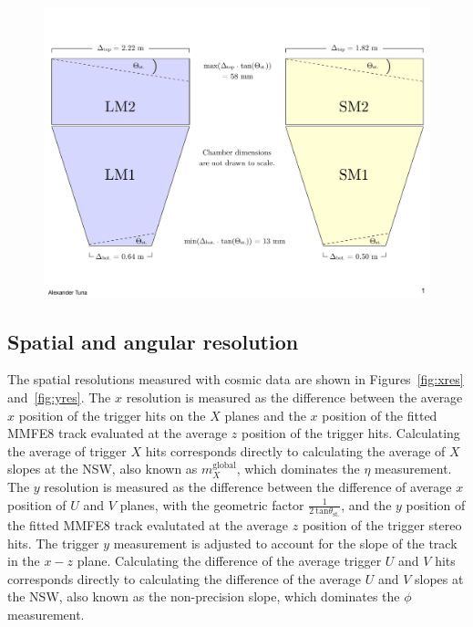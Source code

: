 \begin{figure}[!htpb]
  \begin{center}
    \includegraphics[width=1.0\textwidth]{figures/cartoons/stereo_roads.pdf}
  \end{center}
  \vspace{-10pt}
  \caption{}
  \label{fig:stereo_roads}
\end{figure}

\subsection{Spatial and angular resolution}
\label{sec:perf-res}

The spatial resolutions measured with cosmic data are shown in Figures~\ref{fig:xres} and~\ref{fig:yres}. The $x$ resolution is measured as the difference between the average $x$ position of the trigger hits on the $X$ planes and the $x$ position of the fitted MMFE8 track evaluated at the average $z$ position of the trigger hits. Calculating the average of trigger $X$ hits corresponds directly to calculating the average of $X$ slopes at the NSW, also known as $m_X^\text{global}$, which dominates the $\eta$ measurement. The $y$ resolution is measured as the difference between the difference of average $x$ position of $U$ and $V$ planes, with the geometric factor $\frac{1}{2\ \text{tan}\theta_\text{st.}}$, and the $y$ position of the fitted MMFE8 track evalutated at the average $z$ position of the trigger stereo hits. The trigger $y$ measurement is adjusted to account for the slope of the track in the $x-z$ plane. Calculating the difference of the average trigger $U$ and $V$ hits corresponds directly to calculating the difference of the average $U$ and $V$ slopes at the NSW, also known as the non-precision slope, which dominates the $\phi$ measurement.

